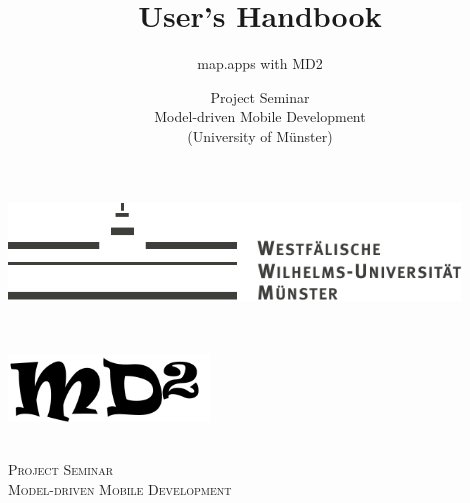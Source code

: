 \documentclass[a4paper, 12pt, titlepage, headsepline, listof = totoc, bibliography = totoc, numbers = noenddot]{scrbook} %
\title{User's Handbook}
\subtitle{map.apps with MD2}
\author{Project Seminar\\
Model-driven Mobile Development\\
(University of Münster)}
\begin{document}
\thispagestyle{empty}
\begin{titlepage}

\newcommand{\HRule}{\rule{\linewidth}{0.5mm}} %

\center %
 

\begin{minipage}[b]{0.5\textwidth}
\begin{flushleft}
\includegraphics[width=0.9\textwidth]{Fig/wwu-logo-title}
\end{flushleft}
\end{minipage}
~
\begin{minipage}[b]{0.4\textwidth}
\begin{flushright}
\includegraphics[width=0.4\textwidth]{Fig/md2-logo}
\end{flushright}
\end{minipage}\\[1.5cm] 
 
 
 

\textsc{\LARGE Project Seminar\\ Model-driven Mobile Development}\\[1.5cm] %



\end{titlepage}
\end{document}
